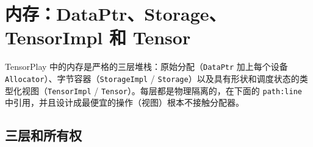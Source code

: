 \section{内存：DataPtr、Storage、TensorImpl 和 Tensor}
\label{sec:memory}

TensorPlay 中的内存是严格的三层堆栈：原始分配（\texttt{DataPtr} 加上每个设备 \texttt{Allocator}）、字节容器（\texttt{StorageImpl} / \texttt{Storage}）以及具有形状和调度状态的类型化视图（\texttt{TensorImpl} / \texttt{Tensor}）。每层都是物理隔离的，在下面的 \texttt{path:line} 中引用，并且设计成最便宜的操作（视图）根本不接触分配器。

\subsection{三层和所有权}
\label{sec:memlayers}

